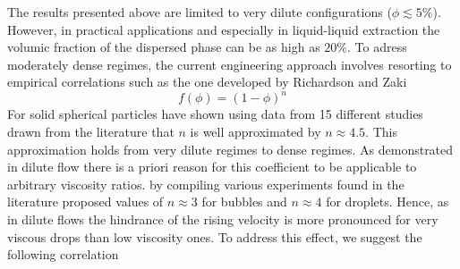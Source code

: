 







The results presented above are limited to very dilute configurations ($\phi \lesssim 5 \%$). However, in practical applications and especially in liquid-liquid extraction the volumic fraction of the dispersed phase can be as high as $20\%$. To adress moderately dense regimes, the current engineering approach involves resorting to empirical correlations such as the one developed by Richardson and Zaki  \citep{richardson1954}
\begin{equation}
f(\phi) = (1-\phi)^n
\label{eq:Richardson} 
\end{equation}
For solid spherical particles \citet{brzinski2018} have shown using data from 15 different studies drawn from the literature that $n$ is well approximated by $n\approx 4.5$. This approximation holds from very dilute regimes to dense regimes. As demonstrated in dilute flow there is a priori reason for this coefficient to be applicable to arbitrary viscosity ratios. \citet{ishii1979drag} by compiling various experiments found in the literature proposed values of $n\approx 3$ for bubbles and $n \approx 4$ for droplets. Hence, as in dilute flows the hindrance of the rising velocity is more pronounced for very viscous drops than low viscosity ones. To address this effect, we suggest the following correlation%

